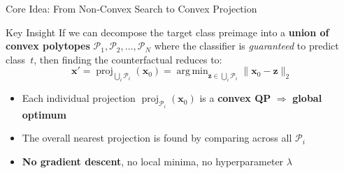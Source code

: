 \documentclass[aspectratio=169, 10pt]{beamer}
\newcommand{\vx}{\mathbf{x}}
\newcommand{\vz}{\mathbf{z}}
\newcommand{\PP}{\mathcal{P}}
\DeclareMathOperator*{\argmin}{arg\,min}
\DeclareMathOperator{\proj}{proj}
\begin{document}
\begin{frame}{Core Idea: From Non-Convex Search to Convex Projection}

\begin{block}{Key Insight}
  If we can decompose the target class preimage into a \textbf{union of convex polytopes}
  $\PP_1, \PP_2, \dots, \PP_N$ where the classifier is \emph{guaranteed} to predict class~$t$,
  then finding the counterfactual reduces to:
  \[
    \vx' = \proj_{\bigcup_i \PP_i}(\vx_0) = \argmin_{\vz \in \bigcup_i \PP_i} \bigl\|\vx_0 - \vz\bigr\|_2
  \]
\end{block}

\bigskip

\begin{itemize}
  \item Each individual projection $\proj_{\PP_i}(\vx_0)$ is a \textbf{convex QP} $\Rightarrow$ \textbf{global optimum}
  \item The overall nearest projection is found by comparing across all $\PP_i$
  \item \textbf{No gradient descent}, no local minima, no hyperparameter $\lambda$
\end{itemize}

\end{frame}
\end{document}
